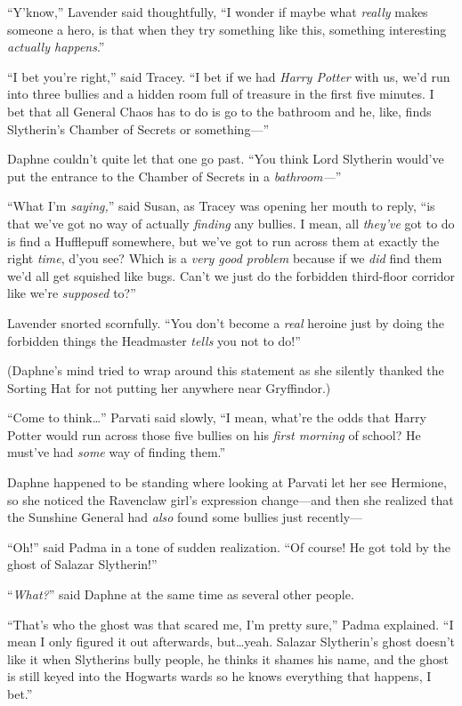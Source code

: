 “Y’know,” Lavender said thoughtfully, “I wonder if maybe what \emph{really} makes someone a hero, is that when they try something like this, something interesting \emph{actually happens}.”

“I bet you’re right,” said Tracey. “I bet if we had \emph{Harry Potter} with us, we’d run into three bullies and a hidden room full of treasure in the first five minutes. I bet that all General Chaos has to do is go to the bathroom and he, like, finds Slytherin’s Chamber of Secrets or something—”

Daphne couldn’t quite let that one go past. “You think Lord Slytherin would’ve put the entrance to the Chamber of Secrets in a \emph{bathroom—}”

“What I’m \emph{saying,}” said Susan, as Tracey was opening her mouth to reply, “is that we’ve got no way of actually \emph{finding} any bullies. I mean, all \emph{they’ve} got to do is find a Hufflepuff somewhere, but we’ve got to run across them at exactly the right \emph{time}, d’you see? Which is a \emph{very good problem} because if we \emph{did} find them we’d all get squished like bugs. Can’t we just do the forbidden third-floor corridor like we’re \emph{supposed} to?”

Lavender snorted scornfully. “You don’t become a \emph{real} heroine just by doing the forbidden things the Headmaster \emph{tells} you not to do!”

(Daphne’s mind tried to wrap around this statement as she silently thanked the Sorting Hat for not putting her anywhere near Gryffindor.)

“Come to think…” Parvati said slowly, “I mean, what’re the odds that Harry Potter would run across those five bullies on his \emph{first morning} of school? He must’ve had \emph{some} way of finding them.”

Daphne happened to be standing where looking at Parvati let her see Hermione, so she noticed the Ravenclaw girl’s expression change—and then she realized that the Sunshine General had \emph{also} found some bullies just recently—

“Oh!” said Padma in a tone of sudden realization. “Of course! He got told by the ghost of Salazar Slytherin!”

“\emph{What?}” said Daphne at the same time as several other people.

“That’s who the ghost was that scared me, I’m pretty sure,” Padma explained. “I mean I only figured it out afterwards, but…yeah. Salazar Slytherin’s ghost doesn’t like it when Slytherins bully people, he thinks it shames his name, and the ghost is still keyed into the Hogwarts wards so he knows everything that happens, I bet.”

